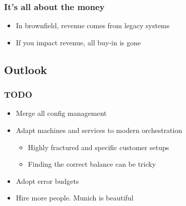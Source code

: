 \documentclass[t]{beamer}
\begin{document}
\begin{frame}
	\frametitle{It's all about the money}
	\begin{itemize}
		\item In brownfield, revenue comes from legacy systems
		\item If you impact revenue, all buy-in is gone
	\end{itemize}
\end{frame}

\subsection{Outlook}

\begin{frame}
	\frametitle{TODO}
	\begin{itemize}
		\item Merge all config management
		\item Adapt machines and services to modern orchestration
		\begin{itemize}
			\item Highly fractured and specific customer setups
			\item Finding the correct balance can be tricky
		\end{itemize}
		\item Adopt error budgets
		\item Hire more people. Munich is beautiful
	\end{itemize}
\end{frame}









%


\end{document}
